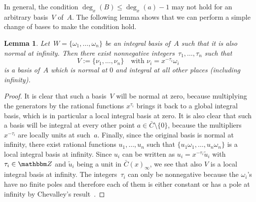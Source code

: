 \documentclass{sig-alternate}
\newtheorem{lemma}[theorem]{Lemma}
\let\set\mathbbm
\begin{document}
In general, the condition $\deg_x(B) \leq \deg_x(a)-1$ may not hold for an arbitrary basis~$V$ of~$A$.
The following lemma shows that we can perform a simple change of bases to make the condition hold.

\begin{lemma}\label{LM:CB}
Let~$W =\{\omega_1, \ldots, \omega_n\}$ be an integral basis of~$A$ such that it is also normal at infinity. Then
there exist nonnegative integers~$\tau_1, \ldots, \tau_n$ such that
\[ V := \{\nu_1, \ldots, \nu_n\} \quad \text{with $\nu_i = x^{-\tau_i} \omega_i$}\]
is a basis of~$A$ which is normal at $0$ and integral at all other places (including infinity).
\end{lemma}
\begin{proof}
It is clear that such a basis~$V$ will be normal at zero, because multiplying the generators by
the rational functions $x^{\tau_i}$ brings it back to a global integral basis, which is in particular
a local integral basis at zero.
It is also clear that such a basis will be integral at every other point $a\in\bar C\setminus\{0\}$, because the
multipliers $x^{-\tau_i}$ are locally units at such~$a$.
Finally, since the original basis is normal at infinity, there exist rational functions $u_1,\dots,u_n$
such that $\{u_1\omega_1,\dots,u_n\omega_n\}$ is a local integral basis at infinity.
Since $u_i$ can be written as $u_i=x^{-\tau_i}\tilde{u}_i$ with $\tau_i\in\set Z$ and $\tilde{u}_i$ being a unit
in $\bar{C}(x)_\infty$, we see that also $V$ is a local integral basis at infinity.
The integers~$\tau_i$ can only be nonnegative because the $\omega_i$'s have no finite poles and therefore each
of them is either constant or has a pole at infinity by Chevalley's result~\cite[Page 9, Corollary 3]{Chevalley1951}.
\end{proof}
\end{document}
